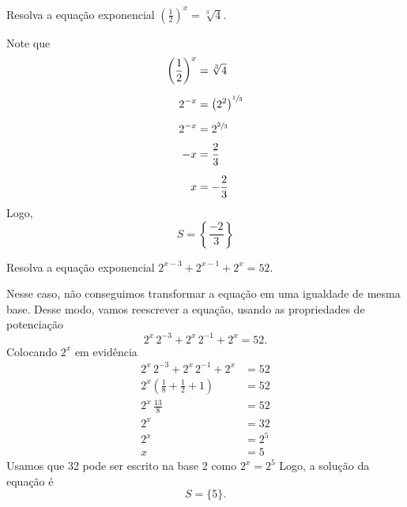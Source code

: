 \begin{example}
  Resolva a equação exponencial
  \(
    \left( \frac{1}{2} \right)^x = \sqrt[3]{4}
  \).

  \solution
  Note que
  \begin{align*}
    \left( \frac{1}{2} \right)^x & = \sqrt[3]{4}                      \\[2mm]
    2^{-x}                       & = \left(2^2\right)^{\sfrac{1}{3}}  \\[2mm]
    2^{-x}                       & = 2^{\sfrac{2}{3}}                 \\[2mm]
    -x                           & = \frac{2}{3}                      \\[2mm]
    x                            & =-\frac{2}{3}
  \end{align*}
  Logo,
  \[
    S = \left\{ \frac{-2}{3} \right\}
  \]
\end{example}

\begin{example}
  Resolva a equação exponencial \(2^{x-3}+2^{x-1}+2^x=52\).

  \solution
  Nesse caso, não conseguimos transformar a equação em uma igualdade de
  mesma base. Desse modo, vamos reescrever a equação, usando as
  propriedades de potenciação
  \[
    2^x \, 2^{-3} + 2^x \, 2^{-1} + 2^x = 52.
  \]
  Colocando $2^x$ em evidência
  \begin{align*}
    2^x \, 2^{-3} + 2^x \, 2^{-1} + 2^x              & = 52  \\[2mm]
    2^x \left( \frac{1}{8}+  \frac{1}{2} + 1 \right) & = 52  \\[2mm]
    2^x \, \frac{13}{8}                              & = 52  \\[2mm]
    2^x                                              & = 32  \\[2mm]
    2^x                                              & = 2^5 \\[2mm]
    x                                                & = 5
  \end{align*}
  Usamos que 32 pode ser escrito na base 2 como $2^x=2^5$
  Logo, a solução da equação é
  \[
    S = \{ 5 \}.
  \]
\end{example}

